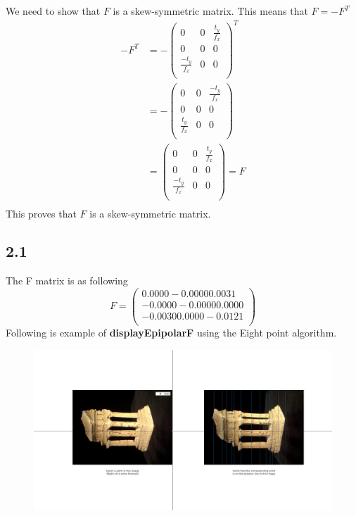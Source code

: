 \documentclass{article}
\begin{document}
We need to show that $F$ is a skew-symmetric matrix. This means that $F = -F^T$
\begin{equation*}
\begin{aligned}
-F^T &=
-
\begin{pmatrix}
0& 0 & \frac{t_y}{f_x}\\
0& 0 & 0\\
\frac{-t_y}{f_x}& 0 & 0\\
\end{pmatrix}^T\\
&= 
-
\begin{pmatrix}
0& 0 & \frac{-t_y}{f_x}\\
0& 0 & 0\\
\frac{t_y}{f_x}& 0 & 0\\
\end{pmatrix}\\
&=
\begin{pmatrix}
0& 0 & \frac{t_y}{f_x}\\
0& 0 & 0\\
\frac{-t_y}{f_x}& 0 & 0\\
\end{pmatrix} = F\\
\end{aligned}
\end{equation*}
This proves that $F$ is a skew-symmetric matrix.
\subsection*{2.1}
The F matrix is as following
\begin{equation*}
F = 
\begin{pmatrix}
    0.0000   -0.0000    0.0031\\
   -0.0000   -0.0000    0.0000\\
   -0.0030    0.0000   -0.0121\\
\end{pmatrix}
\end{equation*}
Following is example of \textbf{displayEpipolarF} using the Eight point algorithm.
\begin{figure}[H]
    \centering
    \includegraphics[width=6.5in]{./figures/q2_1}
\end{figure}
\end{document}
